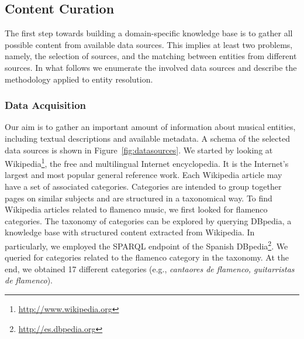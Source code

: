 \subsection{Content Curation}\label{sec:kb_curation}

The first step towards building a domain-specific knowledge base is to gather all possible content from available data sources. This implies at least two problems, namely, the selection of sources, and the matching between entities from different sources. In what follows we enumerate the involved data sources and describe the methodology applied to entity resolution.

\subsubsection{Data Acquisition}\label{sec:datasoruces}

Our aim is to gather an important amount of information about musical entities, including textual descriptions and available metadata. A schema of the selected data sources is shown in Figure~\ref{fig:datasources}. We started by looking at Wikipedia\footnote{\url{http://www.wikipedia.org}}, the free and multilingual Internet encyclopedia. It is the Internet's largest and most popular general reference work. Each Wikipedia article may have a set of associated categories. Categories are intended to group together pages on similar subjects and are structured in a taxonomical way. To find Wikipedia articles related to flamenco music, we first looked for flamenco categories. The taxonomy of categories can be explored by querying DBpedia, a knowledge base with structured content extracted from Wikipedia. In particularly, we employed the SPARQL endpoint of the Spanish DBpedia\footnote{\url{http://es.dbpedia.org}}. We queried for categories related to the flamenco category in the taxonomy. At the end, we obtained 17 different categories (e.g., \textit{cantaores de flamenco, guitarristas de flamenco}).

